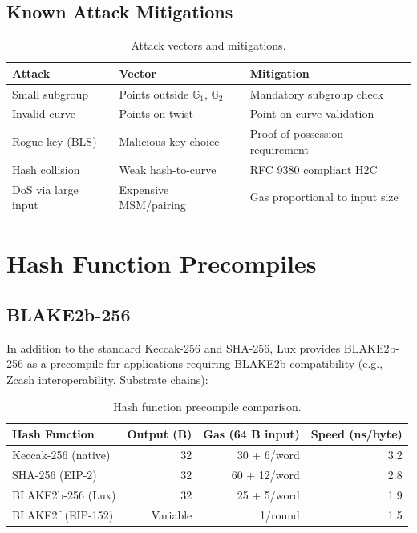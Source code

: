 \documentclass[11pt,a4paper]{article}
\begin{document}
\subsection{Known Attack Mitigations}

\begin{table}[H]
\centering
\caption{Attack vectors and mitigations.}
\label{tab:attacks}
\begin{tabular}{p{3.5cm}p{4cm}p{5cm}}
\toprule
\textbf{Attack} & \textbf{Vector} & \textbf{Mitigation} \\
\midrule
Small subgroup & Points outside $\mathbb{G}_1$, $\mathbb{G}_2$ & Mandatory subgroup check \\
Invalid curve & Points on twist & Point-on-curve validation \\
Rogue key (BLS) & Malicious key choice & Proof-of-possession requirement \\
Hash collision & Weak hash-to-curve & RFC 9380 compliant H2C \\
DoS via large input & Expensive MSM/pairing & Gas proportional to input size \\
\bottomrule
\end{tabular}
\end{table}

\section{Hash Function Precompiles}\label{sec:hash}

\subsection{BLAKE2b-256}

In addition to the standard Keccak-256 and SHA-256, Lux provides BLAKE2b-256 as a precompile for applications requiring BLAKE2b compatibility (e.g., Zcash interoperability, Substrate chains):

\begin{table}[H]
\centering
\caption{Hash function precompile comparison.}
\label{tab:hash}
\begin{tabular}{lrrr}
\toprule
\textbf{Hash Function} & \textbf{Output (B)} & \textbf{Gas (64 B input)} & \textbf{Speed (ns/byte)} \\
\midrule
Keccak-256 (native) & 32 & 30 + 6/word & 3.2 \\
SHA-256 (EIP-2) & 32 & 60 + 12/word & 2.8 \\
BLAKE2b-256 (Lux) & 32 & 25 + 5/word & 1.9 \\
BLAKE2f (EIP-152) & Variable & 1/round & 1.5 \\
\bottomrule
\end{tabular}
\end{table}
\end{document}
